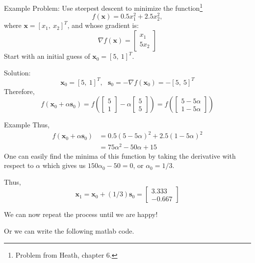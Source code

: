 \documentclass[xcolor=dvipsnames,11pt]{beamer}
\newcommand{\highlight}[1]{\textcolor{BrickRed}{#1}}
\begin{document}
\begin{frame}{Example}
	\highlight{Problem}: Use steepest descent to minimize the function\footnote{Problem from Heath, chapter 6.}   $$f(\mathbf{x}) = 0.5 x_1^2 + 2.5 x_2^2,$$
	where $\mathbf{x} = [x_1,~x_2]^T$, and whose gradient is:
	$$\nabla f(\mathbf{x}) = \begin{bmatrix} x_1 \\ 5x_2 \end{bmatrix}$$
	Start with an initial guess of $\mathbf{x}_0 = [5,~ 1]^T$.
	
	\medskip
	\highlight{Solution}:
	$$\mathbf{x}_0 = [5,~ 1]^T, ~~~ \mathbf{s}_0 = -\nabla f(\mathbf{x}_0) = -[5,~5]^T$$
	\vspace*{-\baselineskip}%
	Therefore, $$f(\mathbf{x}_0 + \alpha \mathbf{s}_0) = f\left(\begin{bmatrix} 5 \\ 1 \end{bmatrix} - \alpha \begin{bmatrix} 5 \\ 5 \end{bmatrix} \right) = f\left(\begin{bmatrix} 5 - 5\alpha \\ 1 - 5\alpha \end{bmatrix}\right)$$
\end{frame}			


\begin{frame}{Example}
	Thus,
	\begin{align*}
		f(\mathbf{x}_0 + \alpha \mathbf{s}_0) & = 0.5 (5 - 5\alpha)^2 + 2.5 (1 - 5\alpha)^2\\
		& = 75 \alpha^2 - 50 \alpha + 15
	\end{align*}
	One can easily find the minima of this function by taking the derivative with respect to $\alpha$ which gives us $150 \alpha_0 - 50 = 0$, or $\alpha_0 = 1/3$.
	
	\medskip
	
	Thus, $$\mathbf{x}_1 = \mathbf{x}_0 + (1/3) \mathbf{s}_0 = \begin{bmatrix} 3.333 \\ -0.667 \end{bmatrix}$$
	
	We can now repeat the process until we are happy!
	
	\medskip
	
	Or we can write the following matlab code.
	
\end{frame}
\end{document}
